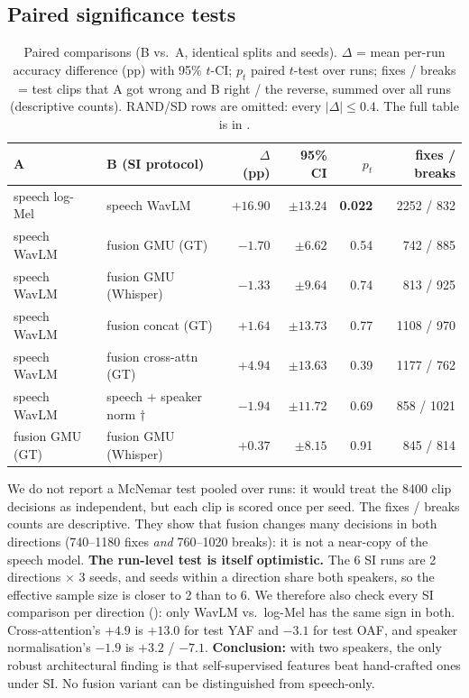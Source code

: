 \subsection{Paired significance tests}
\begin{table}[H]\centering\small
\caption[Paired significance tests (unseen speaker)]{Paired comparisons (B vs.\ A, identical splits and seeds). $\Delta$ = mean per-run accuracy difference (pp) with 95\% $t$-CI; $p_t$ paired $t$-test over runs; fixes / breaks = test clips that A got wrong and B right / the reverse, summed over all runs (descriptive counts). RAND/SD rows are omitted: every $|\Delta|\le0.4$\pp. The full table is in .}\label{tab:sig}
\begin{tabular}{@{}llrrrr@{}}\toprule
A & B (SI protocol) & $\Delta$ (pp) & 95\% CI & $p_t$ & fixes / breaks\\\midrule
speech log-Mel & speech WavLM & $+16.90$ & $\pm13.24$ & \textbf{0.022} & 2252 / 832\\
speech WavLM & fusion GMU (GT) & $-1.70$ & $\pm6.62$ & 0.54 & 742 / 885\\
speech WavLM & fusion GMU (Whisper) & $-1.33$ & $\pm9.64$ & 0.74 & 813 / 925\\
speech WavLM & fusion concat (GT) & $+1.64$ & $\pm13.73$ & 0.77 & 1108 / 970\\
speech WavLM & fusion cross-attn (GT) & $+4.94$ & $\pm13.63$ & 0.39 & 1177 / 762\\
speech WavLM & speech + speaker norm $\dagger$ & $-1.94$ & $\pm11.72$ & 0.69 & 858 / 1021\\
fusion GMU (GT) & fusion GMU (Whisper) & $+0.37$ & $\pm8.15$ & 0.91 & 845 / 814\\\bottomrule
\end{tabular}\end{table}
We do not report a McNemar test pooled over runs: it would treat the 8400 clip decisions as independent, but each clip is scored once per seed.
The fixes / breaks counts are descriptive. They show that fusion changes many decisions in both directions (740--1180 fixes \emph{and} 760--1020 breaks): it is not a near-copy of the speech model.
\textbf{The run-level test is itself optimistic.} The 6 SI runs are 2 directions $\times$ 3 seeds, and seeds within a direction share both speakers, so the effective sample size is closer to 2 than to 6.
We therefore also check every SI comparison per direction (): only WavLM vs.\ log-Mel has the same sign in both.
Cross-attention's $+4.9$\pp{} is $+13.0$\pp{} for test YAF and $-3.1$\pp{} for test OAF, and speaker normalisation's $-1.9$\pp{} is $+3.2$ / $-7.1$\pp.
\textbf{Conclusion:} with two speakers, the only robust architectural finding is that self-supervised features beat hand-crafted ones under SI.
No fusion variant can be distinguished from speech-only.

